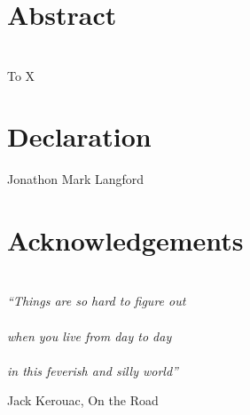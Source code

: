 \chapter*{\centering Abstract}


\chapter*{\centering }%
\begin{center}
    \thispagestyle{empty}
    To X
\end{center}


\chapter*{\centering Declaration}

\begin{flushright}
    Jonathon Mark Langford
\end{flushright}


\chapter*{\centering Acknowledgements}

\tableofcontents
\listoffigures
\listoftables

\chapter*{}
\epigraph{
  \textit{``Things are so hard to figure out \\ \\
            when you live from day to day \\ \\
            in this feverish and silly world''}}
          {Jack Kerouac, On the Road}

\cleardoublepage
